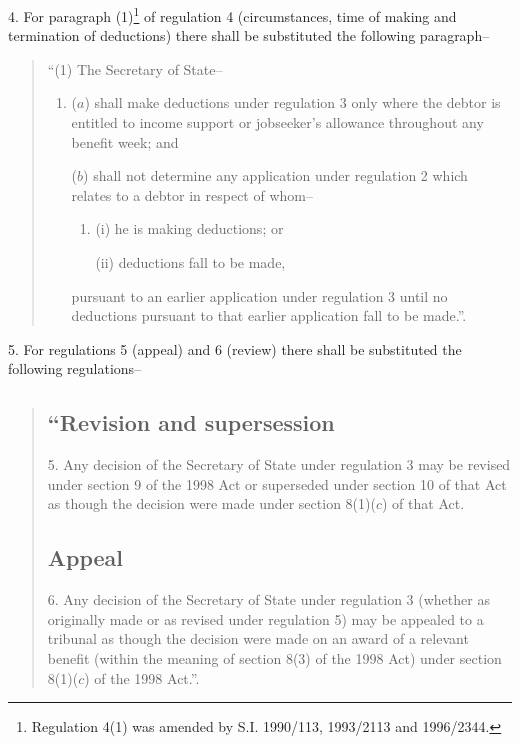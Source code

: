 \documentclass[12pt,a4paper]{article}
\begin{document}
4.  For paragraph (1)\footnote{\frenchspacing Regulation 4(1) was amended by S.I. 1990/113, 1993/2113 and 1996/2344.} of regulation 4 (circumstances, time of making and termination of deductions) there shall be substituted the following paragraph–
\begin{quotation}
“(1) The Secretary of State–
\begin{enumerate}\item[]
($a$) shall make deductions under regulation 3 only where the debtor is entitled to income support or jobseeker’s allowance throughout any benefit week; and

($b$) shall not determine any application under regulation 2 which relates to a debtor in respect of whom–
\begin{enumerate}\item[]
(i) he is making deductions; or

(ii) deductions fall to be made,
\end{enumerate}
pursuant to an earlier application under regulation 3 until no deductions pursuant to that earlier application fall to be made.”.
\end{enumerate}
\end{quotation}

\medskip

5.  For regulations 5 (appeal) and 6 (review) there shall be substituted the following regulations–
\begin{quotation}
\subsection*{“Revision and supersession}

5.  Any decision of the Secretary of State under regulation 3 may be revised under section 9 of the 1998 Act or superseded under section 10 of that Act as though the decision were made under section 8(1)($c$)  of that Act.

\subsection*{Appeal}

6.  Any decision of the Secretary of State under regulation 3 (whether as originally made or as revised under regulation 5) may be appealed to a tribunal as though the decision were made on an award of a relevant benefit (within the meaning of section 8(3) of the 1998 Act) under section 8(1)($c$)  of the 1998 Act.”.
\end{quotation}
\end{document}
